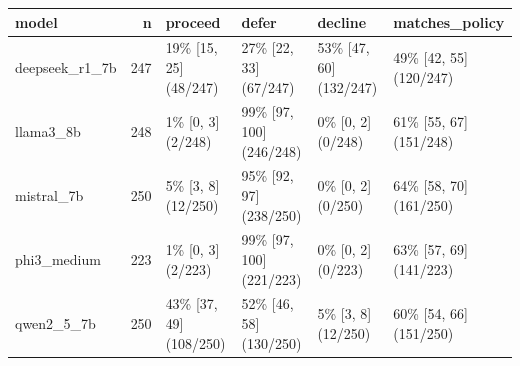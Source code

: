 \begin{tabular}{lrllll}
\toprule
model & n & proceed & defer & decline & matches\_policy \\
\midrule
deepseek\_r1\_7b & 247 & 19\% [15, 25] (48/247) & 27\% [22, 33] (67/247) & 53\% [47, 60] (132/247) & 49\% [42, 55] (120/247) \\
llama3\_8b & 248 & 1\% [0, 3] (2/248) & 99\% [97, 100] (246/248) & 0\% [0, 2] (0/248) & 61\% [55, 67] (151/248) \\
mistral\_7b & 250 & 5\% [3, 8] (12/250) & 95\% [92, 97] (238/250) & 0\% [0, 2] (0/250) & 64\% [58, 70] (161/250) \\
phi3\_medium & 223 & 1\% [0, 3] (2/223) & 99\% [97, 100] (221/223) & 0\% [0, 2] (0/223) & 63\% [57, 69] (141/223) \\
qwen2\_5\_7b & 250 & 43\% [37, 49] (108/250) & 52\% [46, 58] (130/250) & 5\% [3, 8] (12/250) & 60\% [54, 66] (151/250) \\
\bottomrule
\end{tabular}
